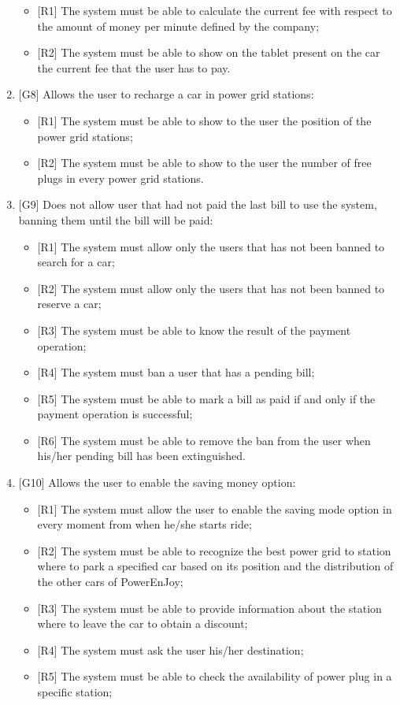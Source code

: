 \begin{enumerate}
\begin{itemize}
	\item {[R1]} The system must be able to calculate the current fee with respect to the amount of money per minute defined by the company;
	\item {[R2]} The system must be able to show on the tablet present on the car the current fee that the user has to pay.
\end{itemize}

\item {[G8]} Allows the user to recharge a car in power grid stations:

\begin{itemize}
	\item {[R1]} The system must be able to show to the user the position of the power grid stations;
	\item {[R2]} The system must be able to show to the user the number of free plugs in every power grid stations.
\end{itemize}

\item {[G9]} Does not allow user that had not paid the last bill to use the system, banning them until the bill will be paid:

\begin{itemize}
	\item {[R1]} The system must allow only the users that has not been banned to search for a car;
	\item {[R2]} The system must allow only the users that has not been banned to reserve a car;
	\item {[R3]} The system must be able to know the result of the payment operation;
	\item {[R4]} The system must ban a user that has a pending bill;
	\item {[R5]} The system must be able to mark a bill as paid if and only if the payment operation is successful;
	\item {[R6]} The system must be able to remove the ban from the user when his/her pending bill has been extinguished.
\end{itemize}

\item {[G10]} Allows the user to enable the saving money option:

\begin{itemize}
	\item {[R1]} The system must allow the user to enable the saving mode option in every moment from when he/she starts ride;
	\item {[R2]} The system must be able to recognize the best power grid to station where to park a specified car based on its position and the distribution of the other cars of PowerEnJoy;
	\item {[R3]} The system must be able to provide information about the station where to leave the car to obtain a discount;
	\item {[R4]} The system must ask the user his/her destination;
	\item {[R5]} The system must be able to check the availability of power plug in a specific station;
\end{itemize}


\end{enumerate}
